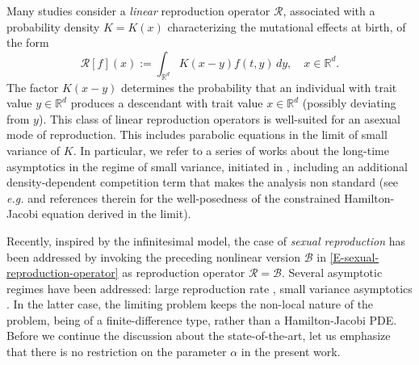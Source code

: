 \documentclass[reqno]{amsart}
\numberwithin{equation}{section}
\begin{document}
{Many studies consider a {\it linear} reproduction operator $\mathcal{R}$, associated with a probability density $K=K(x)$ characterizing the mutational effects at birth, of the form
\begin{equation}\label{E-asexual-reproduction-operator}
\mathcal{R}[f](x):=\int_{\mathbb{R}^d}K(x-y)f(t,y)\,dy,\quad x\in \mathbb{R}^d.
\end{equation}
The factor $K(x-y)$ determines the probability that an individual with trait value $y\in \mathbb{R}^d$ produces a descendant with trait value $x\in \mathbb{R}^d$ (possibly deviating from $y$). This class of linear reproduction operators is well-suited for an asexual mode of reproduction. This includes parabolic equations in the limit of small variance of $K$. In particular, we refer to a series of works about the long-time asymptotics in the regime of small variance, initiated in \cite{BM-07, BMP-09, DJMP-05}, including an additional density-dependent competition term that makes the analysis non standard (see {\em e.g.} \cite{CL-20} and references therein for the well-posedness of the constrained Hamilton-Jacobi equation derived in the limit).

Recently, inspired by the infinitesimal model, the case of {\it sexual reproduction} has been addressed by invoking the preceding nonlinear version $\mathcal{B}$ in \eqref{E-sexual-reproduction-operator} as reproduction operator $\mathcal{R}=\mathcal{B}$. Several asymptotic regimes have been addressed: large reproduction rate \cite{MR-13, R-17-arxiv, R-21-arxiv}, small variance asymptotics \cite{CGP-19, P-20-arxiv}. In the latter case, the limiting problem keeps the non-local nature of the problem, being of a finite-difference type, rather than a Hamilton-Jacobi PDE. Before we continue the discussion about the state-of-the-art, let us emphasize that there is no restriction on the parameter $\alpha$ in the present work.

}
\end{document}
